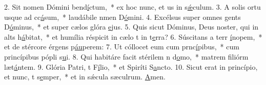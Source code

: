 2. Sit nomen Dómini bend\uline{í}ctum,~* ex hoc nunc, et us in s\uline{ǽ}culum.
3. A solis ortu usque ad cc\uline{á}sum,~* laudábile nmen D\uline{ó}mini.
4. Excélsus super omnes gents D\uline{ó}minus,~* et super cælos glóra \uline{e}jus.
5. Quis sicut Dóminus, Deus noster, qui in alts h\uline{á}bitat,~* et humília réspicit in cælo t in t\uline{e}rra?
6. Súscitans a terr \uline{í}nopem,~* et de stércore érgens p\uline{áu}perem:
7. Ut cóllocet eum cum prnc\uline{í}pibus,~* cum princípibus pópli s\uline{u}i.
8. Qui habitáre facit stérilem n d\uline{o}mo,~* matrem filiórm læt\uline{á}ntem.
9. Glória Patri, t F\uline{í}lio,~* et Spiríti S\uline{a}ncto.
10. Sicut erat in princípio, et nunc, t s\uline{e}mper,~* et in sǽcula sæculrum. \uline{A}men.
